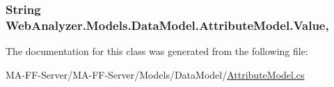 \subsubsection[{Value}]{\setlength{\rightskip}{0pt plus 5cm}String Web\+Analyzer.\+Models.\+Data\+Model.\+Attribute\+Model.\+Value\hspace{0.3cm}{\ttfamily [get]}, {\ttfamily [set]}}\label{class_web_analyzer_1_1_models_1_1_data_model_1_1_attribute_model_a132abb603aaf2d5bd36c3c3477b1c21d}


The documentation for this class was generated from the following file\+:\begin{DoxyCompactItemize}
\item 
M\+A-\/\+F\+F-\/\+Server/\+M\+A-\/\+F\+F-\/\+Server/\+Models/\+Data\+Model/\hyperlink{_attribute_model_8cs}{Attribute\+Model.\+cs}\end{DoxyCompactItemize}
